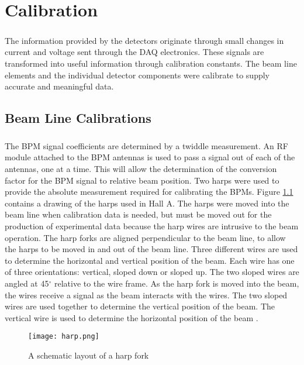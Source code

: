
\chapter{Calibration}





\paragraph{}The information provided by the detectors originate through small changes in current and voltage sent through the DAQ electronics. These signals are transformed into useful information through calibration constants. The beam line elements and the individual detector components were calibrate to supply accurate and meaningful data. 


\section{Beam Line Calibrations} \label{sec:blcals}
 \paragraph{} The BPM signal coefficients are determined by a twiddle measurement. An RF module attached to the BPM antennas is used to pass a signal out of each of the antennas, one at a time. This will allow the determination of the conversion factor for the BPM signal to relative beam position. Two harps were used to provide the absolute measurement required for calibrating the BPMs. Figure \ref{harp} contains a drawing of the harps used in Hall A. The harps were moved into the beam line when calibration data is needed, but must be moved out for the production of experimental data because the harp wires are intrusive to the beam operation.  The harp forks are aligned perpendicular to the beam line, to allow the harps to be moved in and out of the beam line. Three different wires are used to determine the horizontal and vertical position of the beam. Each wire has one of three orientations: vertical, sloped down or sloped up. The two sloped wires are angled at 45$^{\circ}$ relative to the wire frame. As the harp fork is moved into the beam, the wires receive a signal as the beam interacts with the wires. The two sloped wires are used together to determine the vertical position of the beam. The vertical wire is used to determine the horizontal position of the beam \cite{BPM,BPM2}. 
		 	\begin{figure}[H]
		 		\centering
		 		\caption{A schematic layout of a harp fork \cite{BPM2} }
		 		\label{harp}
		 		\texttt{[image: harp.png]} 
		 	\end{figure}  	
	 
